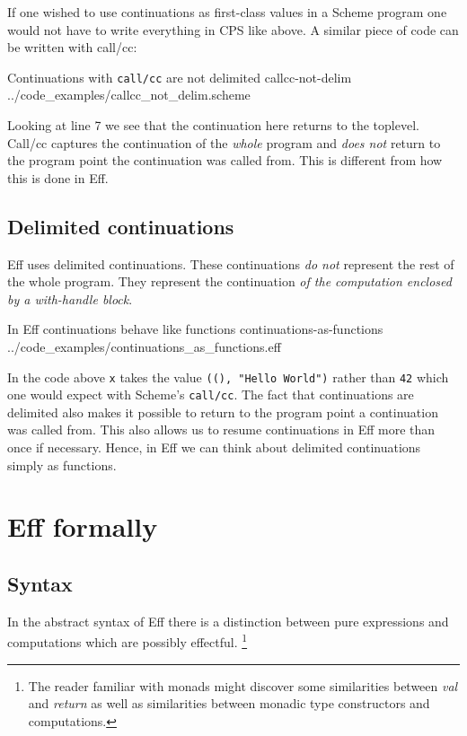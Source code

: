 \documentclass[class=article, crop=false]{standalone}
\begin{document}
If one wished to use continuations as first-class values in a Scheme program
one would not have to write everything in CPS like above. A similar piece of
code can be written with call/cc:

{Continuations with \lstinline{call/cc} are not delimited}
{callcc-not-delim}
{../code_examples/callcc_not_delim.scheme}

Looking at line 7 we see that the continuation here returns to the toplevel.
Call/cc captures the continuation of the \emph{whole} program and
\emph{does not} return to the program point the continuation was called from.
This is different from how this is done in Eff.

\subsection{Delimited continuations}

Eff uses delimited continuations. These continuations \emph{do not} represent
the rest of the whole program. They represent the continuation
\emph{of the computation enclosed by a with-handle block}.

{In Eff continuations behave like functions}
{continuations-as-functions}
{../code_examples/continuations_as_functions.eff}

In the code above \lstinline{x} takes the value \lstinline{((), "Hello World")}
rather than \lstinline{42} which one would expect with Scheme's
\lstinline|call/cc|. The fact that continuations are delimited also makes it
possible to return to the program point a continuation was called from. This
also allows us to resume continuations in Eff more than once if necessary.
Hence, in Eff we can think about delimited continuations simply as functions.

\section{Eff formally}

\subsection{Syntax}

In the abstract syntax of Eff there is a distinction between pure expressions
and computations which are possibly effectful.
\footnote{The reader familiar with monads might discover some similarities
between \emph{val} and \emph{return} as well as similarities between monadic
type constructors and computations.}
\end{document}
